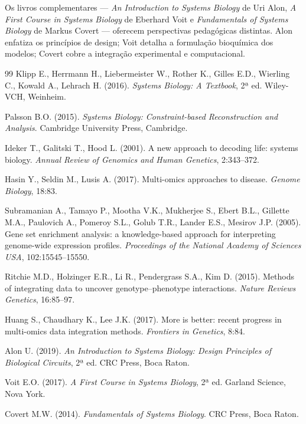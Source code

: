 {Os livros complementares --- \textit{An Introduction to Systems Biology} de
Uri Alon, \textit{A First Course in Systems Biology} de Eberhard Voit e
\textit{Fundamentals of Systems Biology} de Markus Covert --- oferecem
perspectivas pedagógicas distintas. Alon enfatiza os princípios de design;
Voit detalha a formulação bioquímica dos modelos; Covert cobre a
integração experimental e computacional.

}

\begin{thebibliography}{99}
 Klipp E., Herrmann H., Liebermeister W., Rother K., Gilles
E.D., Wierling C., Kowald A., Lehrach H. (2016). \textit{Systems Biology:
A Textbook}, 2ª ed. Wiley-VCH, Weinheim.

 Palsson B.O. (2015). \textit{Systems Biology:
Constraint-based Reconstruction and Analysis}. Cambridge University Press,
Cambridge.

 Ideker T., Galitski T., Hood L. (2001). A new approach to
decoding life: systems biology. \textit{Annual Review of Genomics and Human
Genetics}, 2:343--372.

 Hasin Y., Seldin M., Lusis A. (2017). Multi-omics approaches
to disease. \textit{Genome Biology}, 18:83.

 Subramanian A., Tamayo P., Mootha V.K., Mukherjee S.,
Ebert B.L., Gillette M.A., Paulovich A., Pomeroy S.L., Golub T.R., Lander
E.S., Mesirov J.P. (2005). Gene set enrichment analysis: a
knowledge-based approach for interpreting genome-wide expression profiles.
\textit{Proceedings of the National Academy of Sciences USA}, 102:15545--15550.

 Ritchie M.D., Holzinger E.R., Li R., Pendergrass S.A.,
Kim D. (2015). Methods of integrating data to uncover genotype--phenotype
interactions. \textit{Nature Reviews Genetics}, 16:85--97.

 Huang S., Chaudhary K., Lee J.K. (2017). More is better:
recent progress in multi-omics data integration methods. \textit{Frontiers
in Genetics}, 8:84.

 Alon U. (2019). \textit{An Introduction to Systems Biology:
Design Principles of Biological Circuits}, 2ª ed. CRC Press, Boca Raton.

 Voit E.O. (2017). \textit{A First Course in Systems Biology},
2ª ed. Garland Science, Nova York.

 Covert M.W. (2014). \textit{Fundamentals of Systems
Biology}. CRC Press, Boca Raton.


\end{thebibliography}
